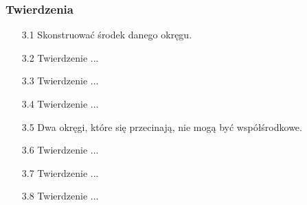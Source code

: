 \subsubsection{Twierdzenia}
\begin{enumerate}
    \item [3.1] Skonstruować środek danego okręgu. 
    \item [3.2] Twierdzenie ...
    \item [3.3] Twierdzenie ...
    \item [3.4] Twierdzenie ...
    \item [3.5] Dwa okręgi, które się przecinają, nie mogą być współśrodkowe. 
    \item [3.6] Twierdzenie ...
    \item [3.7] Twierdzenie ...
    \item [3.8] Twierdzenie ...

\end{enumerate}
